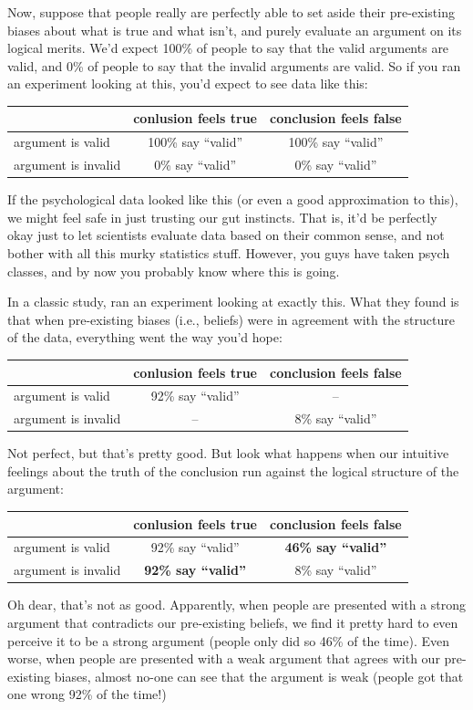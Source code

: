 \documentclass[
]{book}
\begin{document}
Now, suppose that people really are perfectly able to set aside their pre-existing biases about what is true and what isn't, and purely evaluate an argument on its logical merits. We'd expect 100\% of people to say that the valid arguments are valid, and 0\% of people to say that the invalid arguments are valid. So if you ran an experiment looking at this, you'd expect to see data like this:

\begin{longtable}[]{@{}lcc@{}}
\toprule
& conlusion feels true & conclusion feels false\tabularnewline
\midrule
\endhead
argument is valid & 100\% say ``valid'' & 100\% say ``valid''\tabularnewline
argument is invalid & 0\% say ``valid'' & 0\% say ``valid''\tabularnewline
\bottomrule
\end{longtable}

If the psychological data looked like this (or even a good approximation to this), we might feel safe in just trusting our gut instincts. That is, it'd be perfectly okay just to let scientists evaluate data based on their common sense, and not bother with all this murky statistics stuff. However, you guys have taken psych classes, and by now you probably know where this is going.

In a classic study, \citet{Evans1983} ran an experiment looking at exactly this. What they found is that when pre-existing biases (i.e., beliefs) were in agreement with the structure of the data, everything went the way you'd hope:

\begin{longtable}[]{@{}lcc@{}}
\toprule
& conlusion feels true & conclusion feels false\tabularnewline
\midrule
\endhead
argument is valid & 92\% say ``valid'' & --\tabularnewline
argument is invalid & -- & 8\% say ``valid''\tabularnewline
\bottomrule
\end{longtable}

Not perfect, but that's pretty good. But look what happens when our intuitive feelings about the truth of the conclusion run against the logical structure of the argument:

\begin{longtable}[]{@{}lcc@{}}
\toprule
& conlusion feels true & conclusion feels false\tabularnewline
\midrule
\endhead
argument is valid & 92\% say ``valid'' & \textbf{46\% say ``valid''}\tabularnewline
argument is invalid & \textbf{92\% say ``valid''} & 8\% say ``valid''\tabularnewline
\bottomrule
\end{longtable}

Oh dear, that's not as good. Apparently, when people are presented with a strong argument that contradicts our pre-existing beliefs, we find it pretty hard to even perceive it to be a strong argument (people only did so 46\% of the time). Even worse, when people are presented with a weak argument that agrees with our pre-existing biases, almost no-one can see that the argument is weak (people got that one wrong 92\% of the time!)
\end{document}
